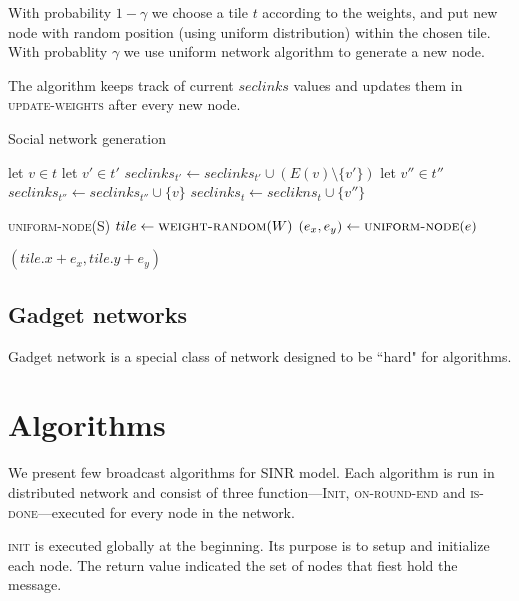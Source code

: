 \documentclass[a4paper,12pt]{report}
\begin{document}
With probability $1 - \gamma$ we choose a tile $t$ according to the weights, and put new node with random position (using uniform distribution) within the chosen tile. With probablity $\gamma$ we use uniform network algorithm to generate a new node.

The algorithm keeps track of current $seclinks$ values and updates them in \textsc{update-weights} after every new node.

\begin{algorithm}
\caption{Social network generation}
\label{a:social}
\begin{algorithmic}
	\State let $v \in t$
		\State let $v' \in t'$
		\State $seclinks_{t'} \gets seclinks_{t'} \cup (E(v)  \setminus \{v'\})$
				\State let $v'' \in t''$
				\State $seclinks_{t''} \gets seclinks_{t''} \cup \{v\}$
				\State $seclinks_t \gets seclikns_t \cup \{v''\}$
			\EndIf
		\EndFor
	\EndFor
\EndFunction

\Statex

		\State \Return \textsc{uniform-node}(S)
	\Else
		\State $tile \gets \textsc{weight-random}(W)$
		\State $(e_x, e_y) \gets \textsc{uniform-node}(e)$
		
		\State \Return $(tile.x + e_x, tile.y + e_y)$
	\EndIf
\EndFunction
\end{algorithmic}
\end{algorithm}

\section{Gadget networks}

Gadget network is a special class of network designed to be  ``hard" for algorithms.

\chapter{Algorithms}

We present few broadcast algorithms for SINR model. Each algorithm is run in distributed network and consist of three function---\textsc{Init}, \textsc{on-round-end} and \textsc{is-done}---executed for every node in the network.

\textsc{init} is executed globally at the beginning. Its purpose is to setup and initialize each node. The return value indicated the set of nodes that fiest hold the message.
\end{document}
